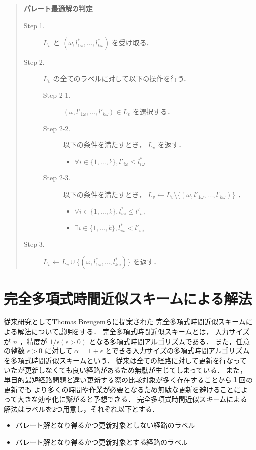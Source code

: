 \documentclass[12pt]{optlab-bachelor}
\begin{document}
\begin{quote}
  \textbf{パレート最適解の判定}
  \begin{description}
    \item[Step 1.] $L_v$ と $(\omega,l^*_{1\omega},\ldots,l^*_{k\omega})$
    を受け取る．
    \item[Step 2.] $L_v$ の全てのラベルに対して以下の操作を行う．
    \begin{description}
    \item[Step 2-1.] $(\omega,l'_{1\omega},\ldots,l'_{k\omega}) \in L_v$
    を選択する．
    \item[Step 2-2.] 以下の条件を満たすとき， $L_v$ を返す．
    \begin{itemize}
      \item $\forall i \in \{1,\ldots,k\},l'_{i\omega} \le l^*_{i\omega}$
    \end{itemize}
    \item[Step 2-3.] 以下の条件を満たすとき，
    $L_v \leftarrow L_v \setminus \{(\omega,l'_{1\omega},\ldots,l'_{k\omega})\}$ ．
    \begin{itemize}
      \item $\forall i \in \{1,\ldots,k\},l^*_{i\omega} \le l'_{i\omega}$
      \item $\exists i \in \{1,\ldots,k\},l^*_{i\omega} < l'_{i\omega}$
    \end{itemize}
    \end{description}
    \item[Step 3.]
    $L_v \leftarrow L_v \cup \{(\omega,l^*_{1\omega},\ldots,l^*_{k\omega})\}$ を返す．
  \end{description}
\end{quote}

\section{完全多項式時間近似スキームによる解法}
従来研究としてThomas Breugemら\cite{Breugem}に提案された
完全多項式時間近似スキームによる解法について説明をする．
完全多項式時間近似スキームとは，
入力サイズが $n$ ，精度が $1 / \epsilon(\epsilon > 0)$
となる多項式時間アルゴリズムである．
また，任意の整数 $\epsilon > 0$ に対して $\alpha = 1+\epsilon$
とできる入力サイズの多項式時間アルゴリズムを多項式時間近似スキームという．
従来は全ての経路に対して更新を行なっていたが更新しなくても良い経路があるため無駄が生じてしまっている．
また，単目的最短経路問題と違い更新する際の比較対象が多く存在することから１回の更新でも
より多くの時間や作業が必要となるため無駄な更新を避けることによって大きな効率化に繋がると予想できる．
完全多項式時間近似スキームによる解法はラベルを2つ用意し，それぞれ以下とする．
\begin{itemize}
\item パレート解となり得るかつ更新対象としない経路のラベル
\item パレート解となり得るかつ更新対象とする経路のラベル
\end{itemize}
\end{document}
